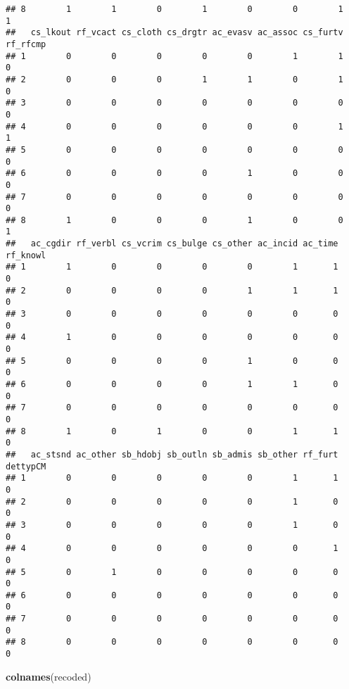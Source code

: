 \documentclass[]{article}
\newenvironment{Shaded}{\begin{snugshade}}{\end{snugshade}}
\newcommand{\KeywordTok}[1]{\textcolor[rgb]{0.13,0.29,0.53}{\textbf{#1}}}
\newcommand{\NormalTok}[1]{#1}
\begin{document}
\begin{verbatim}
## 8        1        1        0        1        0        0        1        1
##   cs_lkout rf_vcact cs_cloth cs_drgtr ac_evasv ac_assoc cs_furtv rf_rfcmp
## 1        0        0        0        0        0        1        1        0
## 2        0        0        0        1        1        0        1        0
## 3        0        0        0        0        0        0        0        0
## 4        0        0        0        0        0        0        1        1
## 5        0        0        0        0        0        0        0        0
## 6        0        0        0        0        1        0        0        0
## 7        0        0        0        0        0        0        0        0
## 8        1        0        0        0        1        0        0        1
##   ac_cgdir rf_verbl cs_vcrim cs_bulge cs_other ac_incid ac_time rf_knowl
## 1        1        0        0        0        0        1       1        0
## 2        0        0        0        0        1        1       1        0
## 3        0        0        0        0        0        0       0        0
## 4        1        0        0        0        0        0       0        0
## 5        0        0        0        0        1        0       0        0
## 6        0        0        0        0        1        1       0        0
## 7        0        0        0        0        0        0       0        0
## 8        1        0        1        0        0        1       1        0
##   ac_stsnd ac_other sb_hdobj sb_outln sb_admis sb_other rf_furt dettypCM
## 1        0        0        0        0        0        1       1        0
## 2        0        0        0        0        0        1       0        0
## 3        0        0        0        0        0        1       0        0
## 4        0        0        0        0        0        0       1        0
## 5        0        1        0        0        0        0       0        0
## 6        0        0        0        0        0        0       0        0
## 7        0        0        0        0        0        0       0        0
## 8        0        0        0        0        0        0       0        0
\end{verbatim}

\begin{Shaded}
\begin{Highlighting}[]
\KeywordTok{colnames}\NormalTok{(recoded)}
\end{Highlighting}
\end{Shaded}
\end{document}
